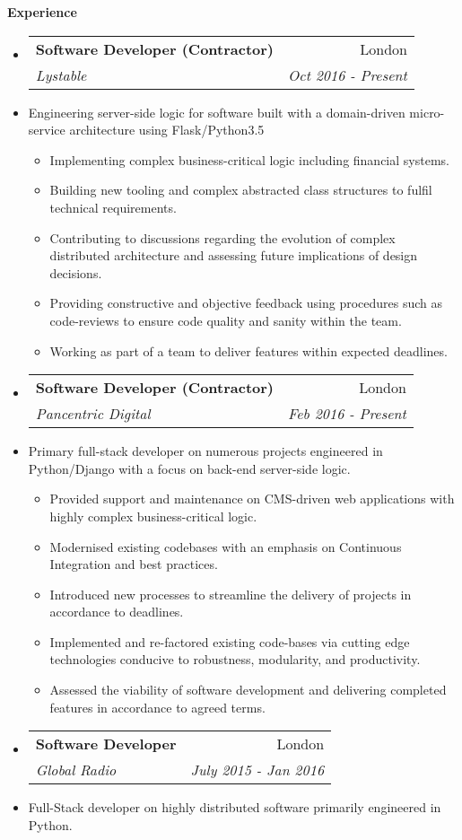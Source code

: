 \documentclass[letterpaper,11pt]{article}
\makeatletter
\newcommand{\resitem}[1]{\item #1 \vspace{-2pt}}
\newcommand{\resheading}[1]{{\large \colorbox{mygrey}
			{\begin{minipage}{\textwidth}
					{\textbf{#1 \vphantom{p\^{E}}}}
		\end{minipage}}}
	}
\newcommand{\ressubheading}[4]{
		\begin{tabular*}{180mm}{l@{\extracolsep{\fill}}r}
			\textbf{#1} & #2 \\
			\textit{#3} & \textit{#4} \\
		\end{tabular*}\vspace{-6pt}
	}
\newcommand{\resdescription}[1]{#1 \vspace{-0mm}}
\makeatother
\begin{document}
	\resheading{Experience}
	\begin{itemize}

		\item[]
            \ressubheading{Software Developer (Contractor)}{London}{Lystable}{Oct 2016 - Present}
		\item[]
			\resdescription{Engineering server-side logic for software built with a domain-driven micro-service architecture using Flask/Python3.5}
			\begin{itemize}
                    \resitem{Implementing complex business-critical logic including financial systems.}
                    \resitem{Building new tooling and complex abstracted class structures to fulfil technical requirements.}
					\resitem{Contributing to discussions regarding the evolution of complex distributed architecture and assessing future implications of design decisions.}
                    \resitem{Providing constructive and objective feedback using procedures such as code-reviews to ensure code quality and sanity within the team.}
					\resitem{Working as part of a team to deliver features within expected deadlines.}
			\end{itemize}
		\item[]
            \ressubheading{Software Developer (Contractor)}{London}{Pancentric Digital}{Feb 2016 - Present}
		\item[]
			\resdescription{Primary full-stack developer on numerous projects engineered in Python/Django with a focus on back-end server-side logic.}
			\begin{itemize}
                    \resitem{Provided support and maintenance on CMS-driven web applications with highly complex business-critical logic.}
                    \resitem{Modernised existing codebases with an emphasis on Continuous Integration and best practices.}
					\resitem{Introduced new processes to streamline the delivery of projects in accordance to deadlines.}
					\resitem{Implemented and re-factored existing code-bases via cutting edge technologies conducive to robustness, modularity, and productivity.}
					\resitem{Assessed the viability of software development and delivering completed features in accordance to agreed terms.}
			\end{itemize}
		\item[]
			\ressubheading{Software Developer}{London}{Global Radio}{July 2015 - Jan 2016}
		\item[]
			\resdescription{Full-Stack developer on highly distributed software primarily engineered in Python.}

\end{itemize}
\end{document}
